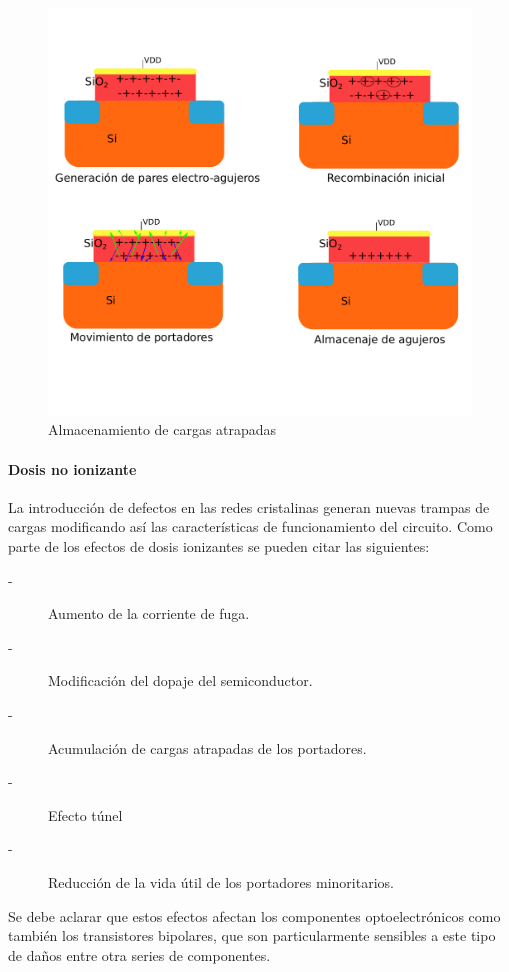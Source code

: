 \documentclass[a4paper,openright,12pt]{report}
\begin{document}
\begin{figure}[H]
	\centering
	\includegraphics[width=0.8 \textwidth]{img/Efectos.pdf}
	\caption{Almacenamiento de cargas atrapadas}
	\label{Efectos}
\end{figure}

\paragraph{Dosis no ionizante }\hfill \break

 La introducción de defectos en las redes cristalinas generan nuevas trampas de cargas modificando así las características de funcionamiento del circuito. Como parte de los efectos de dosis ionizantes se pueden citar las siguientes:

\begin{description}
\item[-] Aumento de la corriente de fuga.
\item[-] Modificación del dopaje del semiconductor.
\item[-] Acumulación de cargas atrapadas de los portadores.
\item[-] Efecto túnel
\item[-] Reducción de la vida útil de los portadores minoritarios.
\end{description}


Se debe aclarar que estos efectos afectan los componentes optoelectrónicos como también los transistores bipolares, que son particularmente sensibles a este tipo de daños entre otra series de componentes.
\end{document}
